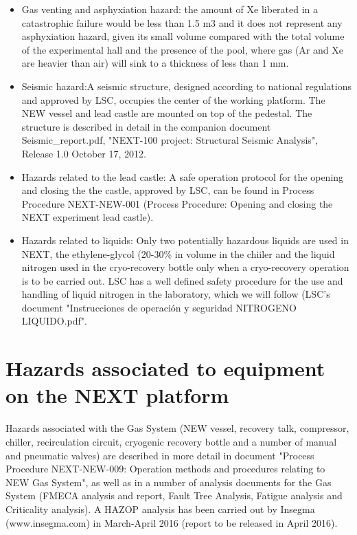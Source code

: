 \documentclass[11pt]{article}
\begin{document}
\begin{itemize}
\item Gas venting and asphyxiation hazard: the amount of Xe liberated in a catastrophic failure would be less than 1.5 m3 and it does not represent any asphyxiation hazard, given its small volume compared with the total volume of the experimental hall and the presence of the pool, where gas 
(Ar and Xe are heavier than air) will sink  to a thickness of less than 1 mm.
\item Seismic hazard:A seismic structure, designed according to national regulations and approved by LSC, occupies the center of the working platform. The NEW vessel and lead castle are mounted on top of the pedestal. The structure is described in detail in the companion document Seismic_report.pdf, "NEXT-100 project: Structural Seismic Analysis",  Release 1.0 October 17, 2012.
\item Hazards related to the lead castle: A safe operation protocol for the opening and closing the the castle, approved by LSC, can be found in Process Procedure NEXT-NEW-001 (Process Procedure: Opening and closing the NEXT experiment lead castle).
\item Hazards related to liquids: Only two potentially hazardous liquids are used in NEXT, the ethylene-glycol (20-30\% in volume in the chiiler and the liquid nitrogen used in the cryo-recovery bottle only when a cryo-recovery operation is to be carried out. LSC has a well defined safety procedure for the use and handling of liquid nitrogen in the laboratory, which we will follow (LSC's document "Instrucciones de operaci\'on y seguridad NITROGENO LIQUIDO.pdf".
\end{itemize}


\section{Hazards associated to equipment on the NEXT platform}
Hazards associated with the Gas System (NEW vessel, recovery talk, compressor, chiller, recirculation circuit, cryogenic recovery bottle and a number of manual and pneumatic valves) 
are described in more detail in document "Process Procedure NEXT-NEW-009: Operation methods and procedures relating to NEW Gas System", as well as in a number of analysis documents 
for the Gas System (FMECA analysis and report, Fault Tree Analysis, Fatigue analysis and Criticality analysis). 
A HAZOP analysis has been carried out by Insegma (www.insegma.com) in March-April 2016 (report to be released in April 2016).
\end{document}
